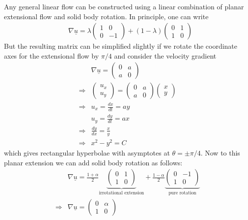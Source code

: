 \documentclass[11pt,a4paper]{article}
\newcommand{\describe}[2]{\underbrace{#2}_{\text{#1}}}%
\newcommand{\vv}[1]{\underline{#1}}
\newcommand{\1}{\vect{1}}
\newcommand{\grad}{\nabla}
\newcommand{\RA}{\Rightarrow}
\begin{document}
Any general linear flow can be constructed using a linear combination of planar extensional flow and solid body rotation. In principle, one can write
\begin{align*}
&\grad \vv u = \lambda{\begin{pmatrix}
1 & 0\\
0 & -1
\end{pmatrix}} + (1-\lambda){\begin{pmatrix}
0 & 1\\
1 & 0
\end{pmatrix}}
\end{align*}
But the resulting matrix can be simplified slightly if we rotate the coordinate axes for the extensional flow by $\pi/4$ and consider the velocity gradient 
\begin{align*}
&\grad \vv u = {\begin{pmatrix}
0 & a \\
a & 0
\end{pmatrix}}\\
\RA& {\begin{pmatrix}
u_x\\
u_y 
\end{pmatrix}} = {\begin{pmatrix}
0 & a\\
a & 0
\end{pmatrix}}{\begin{pmatrix}
x\\
y 
\end{pmatrix}}\\
\RA& u_x = \frac{dx}{dt} = ay\\
& u_y = \frac{dy}{dt} = ax\\
\RA& \frac{dy}{dx} = \frac{x}{y}\\
\RA& x^2 - y ^2 = C
\end{align*}
which gives rectangular hyperbolae with asymptotes at $\theta = \pm \pi/4$. Now to this planar extension we can add solid body rotation as follows:
\begin{align*}
&\grad \vv u  = \frac{1+\alpha}{2}\describe{irrotational extension}{\begin{pmatrix}
0 & 1\\
1 & 0
\end{pmatrix}}
+\frac{1-\alpha}{2}\describe{pure rotation}{\begin{pmatrix}
0 & -1\\
1 & 0
\end{pmatrix}}\\
\RA& \grad \vv u = {\begin{pmatrix}
0 & \alpha \\
1 & 0
\end{pmatrix}}
\end{align*}
\end{document}
